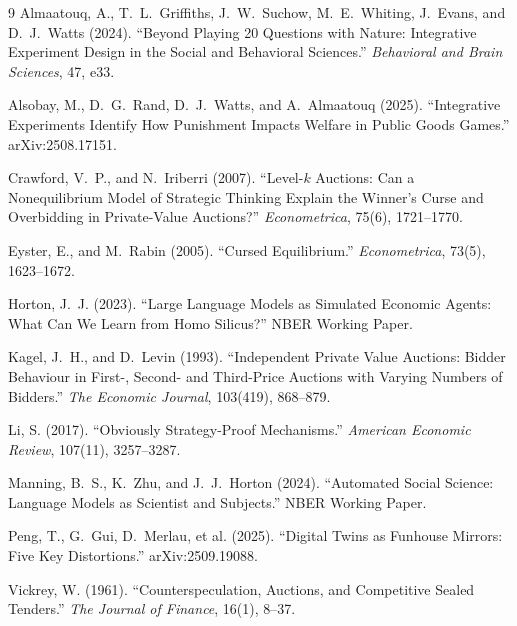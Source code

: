 \documentclass[12pt]{article}
\begin{document}
\begin{thebibliography}{9}
\footnotesize
{}
Almaatouq, A., T.~L.~Griffiths, J.~W.~Suchow, M.~E.~Whiting, J.~Evans, and
D.~J.~Watts (2024). ``Beyond Playing 20 Questions with Nature: Integrative
Experiment Design in the Social and Behavioral Sciences.'' \textit{Behavioral and
Brain Sciences}, 47, e33.

Alsobay, M., D.~G.~Rand, D.~J.~Watts, and A.~Almaatouq (2025). ``Integrative
Experiments Identify How Punishment Impacts Welfare in Public Goods Games.''
arXiv:2508.17151.

Crawford, V.~P., and N.~Iriberri (2007). ``Level-$k$ Auctions: Can a Nonequilibrium
Model of Strategic Thinking Explain the Winner's Curse and Overbidding in
Private-Value Auctions?'' \textit{Econometrica}, 75(6), 1721--1770.

Eyster, E., and M.~Rabin (2005). ``Cursed Equilibrium.'' \textit{Econometrica},
73(5), 1623--1672.

Horton, J.~J. (2023). ``Large Language Models as Simulated Economic Agents: What
Can We Learn from Homo Silicus?'' NBER Working Paper.

Kagel, J.~H., and D.~Levin (1993). ``Independent Private Value Auctions: Bidder
Behaviour in First-, Second- and Third-Price Auctions with Varying Numbers of
Bidders.'' \textit{The Economic Journal}, 103(419), 868--879.

Li, S. (2017). ``Obviously Strategy-Proof Mechanisms.'' \textit{American Economic
Review}, 107(11), 3257--3287.

Manning, B.~S., K.~Zhu, and J.~J.~Horton (2024). ``Automated Social Science:
Language Models as Scientist and Subjects.'' NBER Working Paper.

Peng, T., G.~Gui, D.~Merlau, et al. (2025). ``Digital Twins as Funhouse Mirrors:
Five Key Distortions.'' arXiv:2509.19088.

Vickrey, W. (1961). ``Counterspeculation, Auctions, and Competitive Sealed
Tenders.'' \textit{The Journal of Finance}, 16(1), 8--37.
\end{thebibliography}
\end{document}

